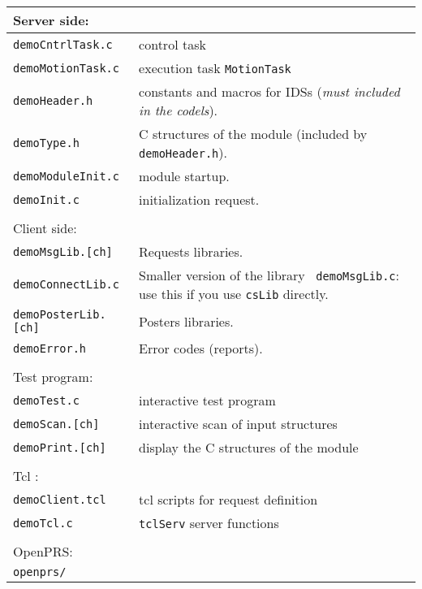 \begin{center}\small
 \begin{tabularx}{\linewidth}{|l|X|}
 \hline
 \multicolumn{2}{|l|}{Server side: } \\
 \hline
 {\tt demoCntrlTask.c}& control task \\
 {\tt demoMotionTask.c}& execution task {\tt MotionTask}  \\
 {\tt demoHeader.h}&  constants and macros for IDSs ({\em must included
in the codels}). \\
 {\tt demoType.h}&  C structures of the module
 (included by {\tt demoHeader.h}). \\ 
 {\tt demoModuleInit.c}& module startup. \\
 {\tt demoInit.c}& initialization request.  \\
 \hline
 \multicolumn{2}{l}{} \\

 \hline
 \multicolumn{2}{|l|}{Client side: } \\
 \hline
 {\tt demoMsgLib.[ch]}  &  Requests libraries. \\
 {\tt demoConnectLib.c}  &  Smaller version of the library {\tt
demoMsgLib.c}: use this if you use {\tt csLib} directly. \\
 {\tt demoPosterLib.[ch]}  &  Posters libraries.\\
 {\tt demoError.h}  &  Error codes (reports).\\
 \hline
 \multicolumn{2}{l}{} \\

 \hline
 \multicolumn{2}{|l|}{Test program:} \\
 \hline
 {\tt demoTest.c}  &  interactive test program\\
 {\tt demoScan.[ch]}  &  interactive  scan of input structures\\
 {\tt demoPrint.[ch]}  &  display the C structures of the module\\
 \hline
 \multicolumn{2}{l}{} \\

 \hline
 \multicolumn{2}{|l|}{Tcl :} \\
 \hline
 {\tt demoClient.tcl}  &  tcl scripts for request definition\\
 {\tt demoTcl.c}  &   {\tt tclServ} server functions\\
 \hline
 \multicolumn{2}{l}{} \\

 \hline
 \multicolumn{2}{|l|}{OpenPRS:} \\
 \hline
 {\tt openprs/}  & \\
 \hline
 \end{tabularx}
\end{center}

